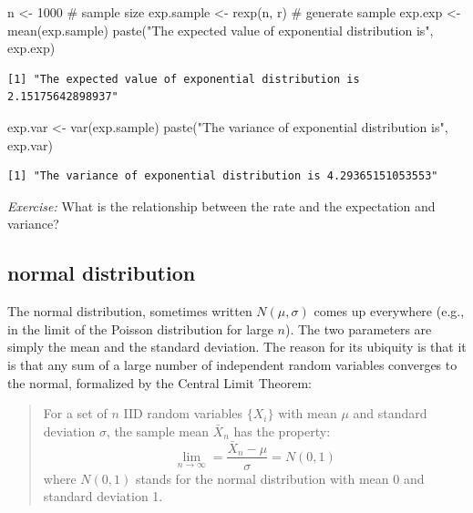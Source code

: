 \documentclass[
  letterpaper,
  DIV=11,
  numbers=noendperiod]{scrreprt}
\newenvironment{Shaded}{\begin{snugshade}}{\end{snugshade}}
\newcommand{\CommentTok}[1]{\textcolor[rgb]{0.37,0.37,0.37}{#1}}
\newcommand{\DecValTok}[1]{\textcolor[rgb]{0.68,0.00,0.00}{#1}}
\newcommand{\FunctionTok}[1]{\textcolor[rgb]{0.28,0.35,0.67}{#1}}
\newcommand{\NormalTok}[1]{\textcolor[rgb]{0.00,0.23,0.31}{#1}}
\newcommand{\OtherTok}[1]{\textcolor[rgb]{0.00,0.23,0.31}{#1}}
\newcommand{\StringTok}[1]{\textcolor[rgb]{0.13,0.47,0.30}{#1}}
\begin{document}
\begin{Shaded}
\begin{Highlighting}[]
\NormalTok{n }\OtherTok{\textless{}{-}} \DecValTok{1000} \CommentTok{\# sample size}
\NormalTok{exp.sample }\OtherTok{\textless{}{-}} \FunctionTok{rexp}\NormalTok{(n, r) }\CommentTok{\# generate sample}
\NormalTok{exp.exp }\OtherTok{\textless{}{-}} \FunctionTok{mean}\NormalTok{(exp.sample)}
\FunctionTok{paste}\NormalTok{(}\StringTok{"The expected value of exponential distribution is"}\NormalTok{, exp.exp)}
\end{Highlighting}
\end{Shaded}

\begin{verbatim}
[1] "The expected value of exponential distribution is 2.15175642898937"
\end{verbatim}

\begin{Shaded}
\begin{Highlighting}[]
\NormalTok{exp.var }\OtherTok{\textless{}{-}} \FunctionTok{var}\NormalTok{(exp.sample)}
\FunctionTok{paste}\NormalTok{(}\StringTok{"The variance of exponential distribution is"}\NormalTok{, exp.var)}
\end{Highlighting}
\end{Shaded}

\begin{verbatim}
[1] "The variance of exponential distribution is 4.29365151053553"
\end{verbatim}

\emph{Exercise:} What is the relationship between the rate and the
expectation and variance?

\hypertarget{normal-distribution}{%
\subsection{normal distribution}\label{normal-distribution}}

The normal distribution, sometimes written \(N(\mu, \sigma)\) comes up
everywhere (e.g., in the limit of the Poisson distribution for large
\(n\)). The two parameters are simply the mean and the standard
deviation. The reason for its ubiquity is that it is that any sum of a
large number of independent random variables converges to the normal,
formalized by the Central Limit Theorem:

\begin{quote}
For a set of \(n\) IID random variables \(\{X_i\}\) with mean \(\mu\)
and standard deviation \(\sigma\), the sample mean \(\bar X_n\) has the
property: \[
\lim_{n \to \infty} = \frac{\bar X_n - \mu}{\sigma} = N(0,1)
\] where \(N(0,1)\) stands for the normal distribution with mean 0 and
standard deviation 1.
\end{quote}
\end{document}
